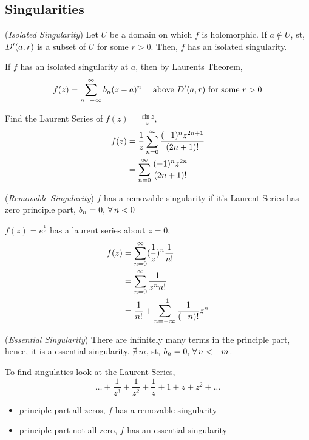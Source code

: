 \documentclass{article}
\begin{document}
\subsection{Singularities}
\begin{ndefi}{(\textit{Isolated Singularity})}
  Let $U$ be a domain on which $f$ is holomorphic. If $a\not\in U$, st, $D'(a, r)$ is a subset of $U$ for some $r > 0$. Then, $f$ has an isolated singularity.
\end{ndefi}

\noindent
If $f$ has an isolated singularity at $a$, then by Laurents Theorem,
$$ f(z) = \sum_{n = -\infty}^{\infty} b_n(z - a)^n \quad \text{ above $D'(a, r)$ for some $r > 0$} $$

\begin{eg}
  Find the Laurent Series of $\displaystyle{f(z) = \frac{\sin z}{z}}$,
  \begin{align*}
    f(z) &= \frac{1}{z}\sum_{n=0}^\infty \frac{(-1)^nz^{2n + 1}}{(2n + 1)!}\\
    &= \sum_{n=0}^\infty \frac{(-1)^nz^{2n}}{(2n + 1)!}
  \end{align*}
\end{eg}

\begin{ndefi}{(\textit{Removable Singularity})}
  $f$ has a removable singularity if it's Laurent Series has zero principle part, $b_n = 0,\,\forall\, n < 0$
\end{ndefi}

\begin{eg}
  $f(z) = e^{\frac{1}{z}}$ has a laurent series about $z = 0$,
  \begin{align*}
    f(z) &= \sum_{n=0}^\infty (\frac{1}{z})^n\frac{1}{n!}\\
    &= \sum_{n=0}^\infty \frac{1}{z^nn!}\\
    &= \frac{1}{n!} + \sum_{n = -\infty}^{-1} \frac{1}{(-n)!}z^n
  \end{align*}
\end{eg}

\begin{ndefi}{(\textit{Essential Singularity})}
  There are infinitely many terms in the principle part, hence, it is a essential singularity. $\nexists\, m$, st, $b_n = 0,\, \forall\, n<-m$.
\end{ndefi}

To find singulaties look at the Laurent Series,
$$ \dots + \frac{1}{z^3} + \frac{1}{z^2} + \frac{1}{z} + 1 + z + z^2 + \dots $$
\begin{itemize}
  \item principle part all zeros, $f$ has a removable singularity
  \item principle part not all zero, $f$ has an essential singularity
\end{itemize}
\end{document}
